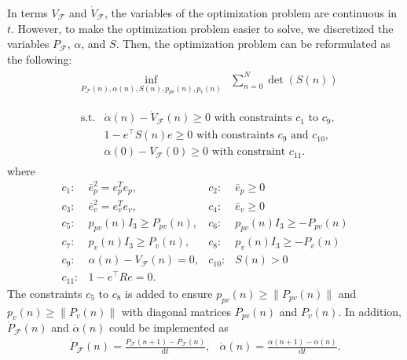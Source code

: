 \documentclass[letterpaper, 10 pt, conference]{ieeeconf}  %
\begin{document}
In terms $V_\mathcal{F}$ and $\dot{V}_\mathcal{F}$, the variables of the optimization problem are continuous in $t$. 
However, to make the optimization problem easier to solve, 
we discretized the variables $P_\mathcal{F}$, $\alpha$, and $S$. 
Then, the optimization problem can be reformulated as the following:
\begin{align}
&
\begin{array}{rl}
\displaystyle{\inf_{P_\mathcal{F}(n),\alpha(n),S(n),p_{pv}(n),p_v(n)}} & \displaystyle{\sum_{n=0}^{N}} \det(S(n))  \\
\end{array} \label{eq:optim2} \\
&
\begin{array}{rl}
\displaystyle{\text{s.t.}}& \dot{\alpha}(n) - \dot{V}_\mathcal{F}(n) \geq 0\text{ with constraints $c_1$ to $c_9$},  \\
& 1-e^\top S(n) e \geq 0\text{ with constraints $c_9$ and $c_{10}$}, \nonumber \\
& \alpha(0) - V_\mathcal{F}(0) \geq 0\text{ with constraint $c_{11}$}. \nonumber
\end{array} \nonumber 
\end{align}
where
\begin{equation}
\begin{array}{rlrl}
c_1:& \bar{e}_p^2 = e_p^Te_p,           & c_2:&\bar{e}_p \geq 0 \\
c_3:& \bar{e}_v^2 = e_v^Te_v,           & c_4:&\bar{e}_v \geq 0 \\
c_5:& p_{pv}(n)I_3 \geq P_{pv}(n),      & c_6:&p_{pv}(n)I_3 \geq -P_{pv}(n) \\
c_7:& p_{ v}(n)I_3 \geq P_{ v}(n),      & c_8:&p_{ v}(n)I_3 \geq -P_{ v}(n) \\
c_9:& \alpha(n) - V_\mathcal{F}(n) = 0, & c_{10}:&S(n) > 0 \\
c_{11}:& 1-e^\top R e = 0. &&
\end{array} \nonumber
\end{equation}
The constraints $c_5$ to $c_8$ is added to ensure
 $p_{pv}(n) \geq \|P_{pv}(n)\|$ and $p_v(n) \geq \|P_v(n)\|$ 
with diagonal matrices $P_{pv}(n)$ and $P_v(n)$.
In addition, $\dot{P}_\mathcal{F}(n)$ and $\dot{\alpha}(n)$ could be implemented as
\begin{equation}
\begin{array}{cc}
\dot{P}_\mathcal{F}(n) = \frac{P_\mathcal{F}(n+1) - P_\mathcal{F}(n)}{\text{d}t}, & \dot{\alpha}(n) = \frac{\alpha(n+1)-\alpha(n)}{\text{d}t}. 
\end{array} \nonumber
\end{equation}
\end{document}
